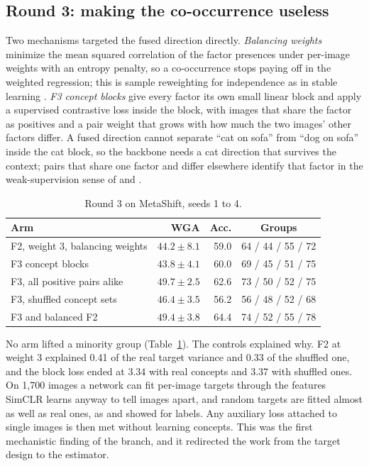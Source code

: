 \documentclass{article}
\begin{document}
\subsection{Round 3: making the co-occurrence useless}
Two mechanisms targeted the fused direction directly.
\emph{Balancing weights} minimize the mean squared correlation of the factor presences under per-image
weights with an entropy penalty, so a co-occurrence stops paying off in the weighted regression; this
is sample reweighting for independence as in stable learning \citep{zhang2021stable}.
\emph{F3 concept blocks} give every factor its own small linear block and apply a supervised contrastive
loss \citep{khosla2020supcon} inside the block, with images that share the factor as positives and a
pair weight that grows with how much the two images' other factors differ. A fused direction cannot
separate ``cat on sofa'' from ``dog on sofa'' inside the cat block, so the backbone needs a cat
direction that survives the context; pairs that share one factor and differ elsewhere identify that
factor in the weak-supervision sense of \citet{locatello2020weakly} and \citet{yao2024multiview}.

\begin{table}[h]
\centering
\caption{Round 3 on MetaShift, seeds 1 to 4.}
\label{tab:round3}
\small
\begin{tabular}{l r r c}
\toprule
Arm & WGA & Acc. & Groups \\
\midrule
F2, weight 3, balancing weights & $44.2\pm8.1$ & 59.0 & 64 / 44 / 55 / 72 \\
F3 concept blocks & $43.8\pm4.1$ & 60.0 & 69 / 45 / 51 / 75 \\
F3, all positive pairs alike & $49.7\pm2.5$ & 62.6 & 73 / 50 / 52 / 75 \\
F3, shuffled concept sets & $46.4\pm3.5$ & 56.2 & 56 / 48 / 52 / 68 \\
F3 and balanced F2 & $49.4\pm3.8$ & 64.4 & 74 / 52 / 55 / 78 \\
\bottomrule
\end{tabular}
\end{table}

No arm lifted a minority group (Table~\ref{tab:round3}). The controls explained why. F2 at weight 3
explained 0.41 of the real target variance and 0.33 of the shuffled one, and the block loss ended at
3.34 with real concepts and 3.37 with shuffled ones. On 1,700 images a network can fit per-image targets
through the features SimCLR learns anyway to tell images apart, and random targets are fitted almost
as well as real ones, as \citet{zhang2017rethinking} and \citet{arpit2017closer} showed for labels. Any
auxiliary loss attached to single images is then met without learning concepts. This was the first
mechanistic finding of the branch, and it redirected the work from the target design to the
estimator.
\end{document}
